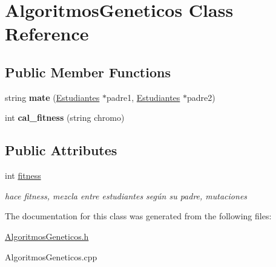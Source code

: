 \hypertarget{classAlgoritmosGeneticos}{}\section{Algoritmos\+Geneticos Class Reference}
\label{classAlgoritmosGeneticos}
\subsection*{Public Member Functions}
\begin{DoxyCompactItemize}
\item 
\mbox{\label{classAlgoritmosGeneticos_ae1bc470fdb8f1a75be80c2b35e0f90ba}} 
string {\bfseries mate} (\hyperlink{classEstudiantes}{Estudiantes} $\ast$padre1, \hyperlink{classEstudiantes}{Estudiantes} $\ast$padre2)
\item 
\mbox{\label{classAlgoritmosGeneticos_ae26a328e0d8f77b76c21d834c0939671}} 
int {\bfseries cal\+\_\+fitness} (string chromo)
\end{DoxyCompactItemize}
\subsection*{Public Attributes}
\begin{DoxyCompactItemize}
\item 
\mbox{\label{classAlgoritmosGeneticos_a820950dea0082055ca9a90ac6fc24c5a}} 
int \hyperlink{classAlgoritmosGeneticos_a820950dea0082055ca9a90ac6fc24c5a}{fitness}
\begin{DoxyCompactList}\small\item\em hace fitness, mezcla entre estudiantes según su padre, mutaciones \end{DoxyCompactList}\end{DoxyCompactItemize}


The documentation for this class was generated from the following files\+:\begin{DoxyCompactItemize}
\item 
\hyperlink{AlgoritmosGeneticos_8h}{Algoritmos\+Geneticos.\+h}\item 
Algoritmos\+Geneticos.\+cpp\end{DoxyCompactItemize}
